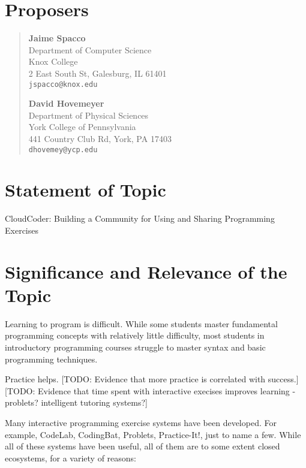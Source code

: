 \documentclass[11pt]{article}
\begin{document}
\section*{Proposers}

\begin{quote}
\begin{minipage}{2.75in}
{\large\bf Jaime Spacco}\\
Department of Computer Science\\
Knox College\\
2 East South St, Galesburg, IL 61401\\
{\tt jspacco@knox.edu}
\end{minipage}
\begin{minipage}{2.75in}
{\large\bf David Hovemeyer}\\
Department of Physical Sciences\\
York College of Pennsylvania\\
441 Country Club Rd, York, PA 17403\\
{\tt dhovemey@ycp.edu}
\end{minipage}
\end{quote}

\section*{Statement of Topic}

{\large CloudCoder: Building a Community for Using and Sharing Programming Exercises}

\section*{Significance and Relevance of the Topic}

Learning to program is difficult.  While some students master
fundamental programming concepts with relatively little difficulty,
most students in introductory programming courses struggle
to master syntax and basic programming techniques.

Practice helps.  [TODO: Evidence that more practice is correlated with
success.]  [TODO: Evidence that time spent with interactive execises
improves learning - problets? intelligent tutoring systems?]

Many interactive programming exercise systems have been developed.
For example, CodeLab, CodingBat, Problets, Practice-It!, just to
name a few.  While all of these systems have been useful, all of
them are to some extent closed ecosystems, for a variety of reasons:
\end{document}

